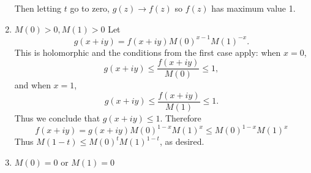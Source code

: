 \documentclass{homework}
\begin{document}
\begin{solution}
\begin{enumerate}
                                                                                                                                                                                  Then letting $t$ go to zero, $g(z)\to f(z)$ so $f(z)$ has maximum value 1.
                                                                                                                                                                                      \item $M(0) > 0, M(1) > 0$
                                                                                                                                                                                              Let 
                                                                                                                                                                                                      \[g(x+iy) = f(x+iy)M(0)^{x-1}M(1)^{-x}.\] 
                                                                                                                                                                                                              This is holomorphic and the conditions from the first case apply: when $x=0$,
                                                                                                                                                                                                                      \[g(x+iy)\leq \frac{f(x+iy)}{M(0)} \leq 1,\] and when $x=1$, \[g(x+iy)\leq \frac{f(x+iy)}{M(1)} \leq 1.\]
                                                                                                                                                                                                                              Thus we conclude that $g(x+iy) \leq 1$. Therefore
                                                                                                                                                                                                                                      \[f(x+iy) = g(x+iy)M(0)^{1-x}M(1)^{x}\leq M(0)^{1-x}M(1)^{x} \]
                                                                                                                                                                                                                                              Thus $M(1-t) \leq M(0)^tM(1)^{1-t}$, as desired.
                                                                                                                                                                                                                                                  \item $M(0)=0$ or $M(1) = 0$
                                                                                                                                                                                                                                                      

\end{enumerate}
\end{solution}
\end{document}
